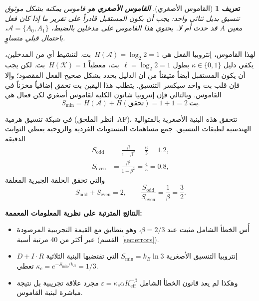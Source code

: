 \documentclass[12pt,a4paper]{article}
\newtheorem{definition}[theorem]{تعريف}
\theoremstyle{remark}
\begin{document}
	\begin{definition}[القاموس الأصغري]
		\textbf{القاموس الأصغري} هو قاموس يمكنه بشكل موثوق تنسيق بديل ثنائي واحد: يجب أن يكون المستقبل قادراً على تقرير ما إذا كان فعل معين \(A\) قد حدث أم لا. يحتوي هذا القاموس على مدخلين بالضبط، \(\mathcal{A} = \{A_0, A_1\}\)، باحتمال قبلي متساوٍ.
	\end{definition}
	
	لهذا القاموس، إنتروبيا الفعل هي \(H(\mathcal{A}) = \log_2 2 = 1\)~بت. لتنشيط أي من المدخلين، يكفي دليل \(\kappa \in \{0,1\}\) بطول \(\ell = \log_2 2 = 1\)~بت، معطياً \(H(\mathcal{K}) = 1\)~بت. لكن يجب أن يكون المستقبل أيضاً متيقناً من أن الدليل يحدد بشكل صحيح الفعل المقصود؛ وإلا فإن قلب بت واحد سيكسر التنسيق. يتطلب هذا اليقين بت تحقق إضافياً مخزناً في القاموس. وبالتالي فإن إنتروبيا شانون الكلية لقاموس أصغري لكن فعال هي
	\begin{equation}
		S_{\min} = H(\mathcal{A}) + H(\text{تحقق}) = 1 + 1 = 2\ \text{بت}.
		\label{eq:smin}
	\end{equation}
	
	في شبكة تنسيق هرمية (انظر الملحق~AF)، تتحقق هذه البنية الأصغرية بالمتوالية الهندسية لطبقات التنسيق. جمع مساهمات المستويات الفردية والزوجية يعطي الثوابت الدقيقة
	\begin{align}
		S_{\mathrm{odd}} &= \frac{\beta}{1-\beta^{2}} = \frac{6}{5} = 1.2, \label{eq:sodd-appx}\\
		S_{\mathrm{even}} &= \frac{\beta^{2}}{1-\beta^{2}} = \frac{4}{5} = 0.8, \label{eq:seven-appx}
	\end{align}
	والتي تحقق الحلقة الجبرية المغلقة
	\begin{equation}
		S_{\mathrm{odd}} + S_{\mathrm{even}} = 2, \qquad
		\frac{S_{\mathrm{odd}}}{S_{\mathrm{even}}} = \frac{1}{\beta} = \frac{3}{2}.
		\label{eq:algebraic-loop-appx}
	\end{equation}
	
	\textbf{النتائج المترتبة على نظرية المعلومات المعممة:}
	\begin{itemize}
		\item أُس الخطأ الشامل مثبت عند \(\beta = 2/3\)، وهو يتطابق مع القيمة التجريبية المرصودة عبر أكثر من 40 مرتبة أسية (القسم~\ref{sec:errors}).
		\item إنتروبيا التنسيق الأصغرية \(S_{\min} = k_B \ln 3\) التي تقتضيها البنية الثلاثية \(D+I\!\cdot\!R\) تعطي \(\kappa_c = e^{-S_{\min}/k_B} = 1/3\).
		\item وهكذا لم يعد قانون الخطأ الشامل \(\varepsilon = \kappa_c \alpha K_{\mathrm{eff}}^{-\beta}\) مجرد علاقة تجريبية بل نتيجة مباشرة لبنية القاموس.
	\end{itemize}
	
\end{document}
